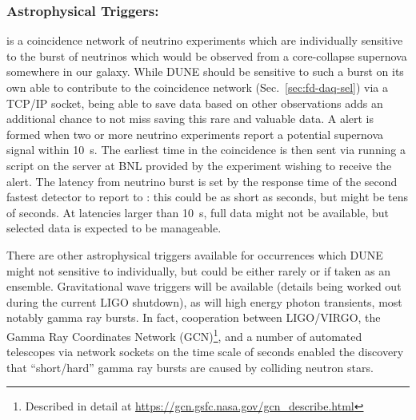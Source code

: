 \subsubsection{Astrophysical Triggers:}  is a coincidence
network of neutrino experiments which are individually sensitive to
the burst of neutrinos which would be observed from a core-collapse
supernova somewhere in our galaxy.
While DUNE should be sensitive to such a burst on its own able to
contribute to the coincidence network (Sec.~\ref{sec:fd-daq-sel}) via
a TCP/IP socket, being able to save data based on other observations
adds an additional chance to not miss saving this rare and valuable
data.
A  alert is formed when two or more neutrino experiments
report a potential supernova signal within \SI{10}{\s}.
The earliest time in the coincidence is then sent via running a script
on the  server at BNL provided by the experiment wishing
to receive the alert.
The latency from neutrino burst is set by the response time of the
second fastest detector to report to : this could be as
short as seconds, but might be tens of seconds.
At latencies larger than \SI{10}{\s}, full data might not be
available, but selected data is expected to be manageable.

There are other astrophysical triggers available for occurrences which
DUNE might not sensitive to individually, but could be either rarely
or if taken as an ensemble.
Gravitational wave triggers will be available (details being worked
out during the current LIGO shutdown), as will high energy photon
transients, most notably gamma ray bursts.
In fact, cooperation between LIGO/VIRGO, the Gamma Ray Coordinates
Network (GCN)\footnote{Described in detail at
  \url{https://gcn.gsfc.nasa.gov/gcn_describe.html}}, and a number of
automated telescopes via network sockets on the time scale of seconds
enabled the discovery that ``short/hard'' gamma ray bursts are caused
by colliding neutron stars\cite{kilonova}.
